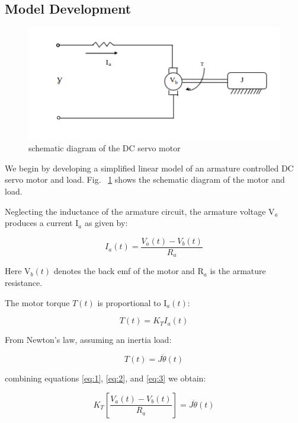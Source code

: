 \documentclass[11pt,a4paper]{article}
\begin{document}
\subsection{Model Development}
\begin{figure}[here]
\includegraphics[width=\textwidth]{imglab/servoschemdiagram.png}
\caption{schematic diagram of the DC servo motor}
\label{fig:servoschem}
\end{figure}

We begin by developing a simplified linear model of an armature controlled DC servo motor and load. Fig. ~\ref{fig:servoschem} shows the schematic diagram of the motor and load.

Neglecting the inductance of the armature circuit, the armature voltage V$_{a}$ produces a current I$_{a}$ as given by:

\begin{equation} \label{eq:1}
I_{a}(t) = \frac{V_{a}(t)-V_{b}(t)}{R_{a}}
\end{equation}

Here V$_{b}(t)$ denotes the back emf of the motor and R$_{a}$ is the armature resistance.

The motor torque $T(t)$ is proportional to I$_{a}(t)$:

\begin{equation} \label{eq:2}
T(t) = K_{T}I_{a}(t)
\end{equation}

From Newton's law, assuming an inertia load:

\begin{equation} \label{eq:3}
T(t) = J\ddot{\theta}(t)
\end{equation}

combining equations \ref{eq:1}, \ref{eq:2}, and \ref{eq:3} we obtain:

\begin{equation} \label{eq:4}
K_{T}\left[\frac{V_{a}(t)-V_{b}(t)}{R_{a}}\right] = J\ddot{\theta}(t)
\end{equation} 
\end{document}
